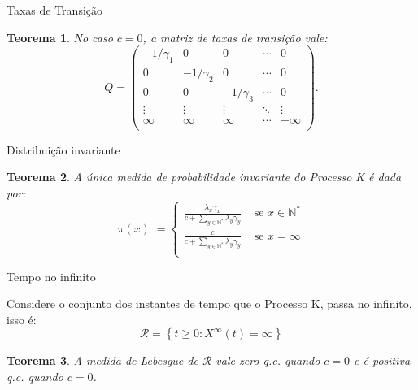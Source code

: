 \documentclass[xcolor=pdftex,dvipsnames]{beamer}
\newcommand{\RR}{{\mathcal{R}}}
\newcommand{\Nz}{{\mathbb{N^*}}}
\newcommand{\qc}{{\emph{q.c.}} }
\newtheorem{teorema}{Teorema}
\begin{document}
\begin{frame}{Taxas de Transição}
  \begin{teorema}
    No caso $c = 0$, a matriz de taxas de transição vale:
    \begin{displaymath}
      Q = \left(
        \begin{array}{ccccc}
          -1/\gamma_1 & 0 & 0 & \cdots & 0\\
          0 & -1/\gamma_2 & 0 & \cdots & 0\\
          0 & 0 & -1/\gamma_3 & \cdots & 0\\
          \vdots & \vdots & \vdots & \ddots & \vdots \\
          \infty & \infty & \infty & \cdots & -\infty\\
        \end{array}
      \right).
    \end{displaymath}
  \end{teorema}
\end{frame}

\begin{frame}{Distribuição invariante}
  \begin{teorema}
    A única medida de probabilidade invariante do Processo K é dada
    por:
    \begin{displaymath}
      \pi(x) := \begin{cases}
        \frac{\lambda_x \gamma_x}{c + \sum_{y \in \Nz} \lambda_y \gamma_y}
        & \textrm{ se } x \in \Nz \\
        \frac{c}{c + \sum_{y \in \Nz} \lambda_y \gamma_y}
        & \textrm{ se } x = \infty \\
      \end{cases}
    \end{displaymath}
  \end{teorema}
\end{frame}


\begin{frame}{Tempo no infinito}

  Considere o conjunto dos instantes de tempo que o Processo K, passa
  no infinito, isso é:
  \begin{displaymath}
    \RR = \left\{ t \geq 0: X^\infty(t) = \infty \right\}
  \end{displaymath}
  \pause
  \begin{teorema}
    A medida de Lebesgue de $\RR$ vale zero \qc quando $c = 0$ e é
    positiva \qc quando $c = 0$.
  \end{teorema}
\end{frame}
\end{document}
